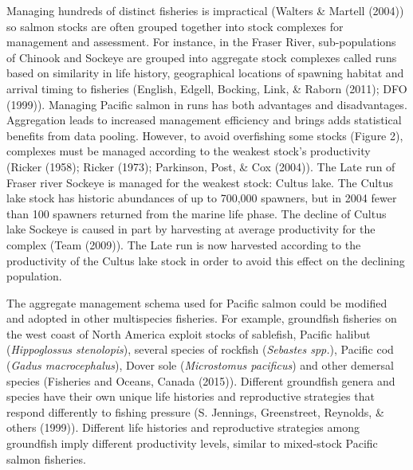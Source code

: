 \documentclass[12pt,]{scrartcl}
\begin{document}
Managing hundreds of distinct fisheries is impractical (Walters \&
Martell (2004)) so salmon stocks are often grouped together into stock
complexes for management and assessment. For instance, in the Fraser
River, sub-populations of Chinook and Sockeye are grouped into aggregate
stock complexes called runs based on similarity in life history,
geographical locations of spawning habitat and arrival timing to
fisheries (English, Edgell, Bocking, Link, \& Raborn (2011); DFO
(1999)). Managing Pacific salmon in runs has both advantages and
disadvantages. Aggregation leads to increased management efficiency and
brings adds statistical benefits from data pooling. However, to avoid
overfishing some stocks (Figure 2), complexes must be managed according
to the weakest stock's productivity (Ricker (1958); Ricker (1973);
Parkinson, Post, \& Cox (2004)). The Late run of Fraser river Sockeye is
managed for the weakest stock: Cultus lake. The Cultus lake stock has
historic abundances of up to 700,000 spawners, but in 2004 fewer than
100 spawners returned from the marine life phase. The decline of Cultus
lake Sockeye is caused in part by harvesting at average productivity for
the complex (Team (2009)). The Late run is now harvested according to
the productivity of the Cultus lake stock in order to avoid this effect
on the declining population.

The aggregate management schema used for Pacific salmon could be
modified and adopted in other multispecies fisheries. For example,
groundfish fisheries on the west coast of North America exploit stocks
of sablefish, Pacific halibut (\emph{Hippoglossus stenolopis}), several
species of rockfish (\emph{Sebastes spp.}), Pacific cod (\emph{Gadus
macrocephalus}), Dover sole (\emph{Microstomus pacificus}) and other
demersal species (Fisheries and Oceans, Canada (2015)). Different
groundfish genera and species have their own unique life histories and
reproductive strategies that respond differently to fishing pressure (S.
Jennings, Greenstreet, Reynolds, \& others (1999)). Different life
histories and reproductive strategies among groundfish imply different
productivity levels, similar to mixed-stock Pacific salmon fisheries.
\end{document}

